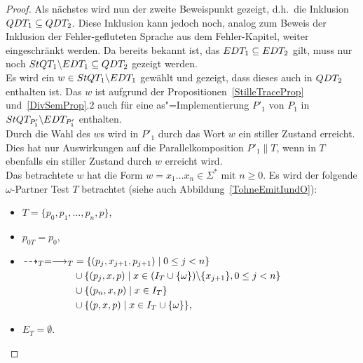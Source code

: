 \begin{proof}
  Als nächstes wird nun der zweite Beweispunkt gezeigt, d.h.\ die Inklusion
  $QDT _1\subseteq QDT _2$. Diese Inklusion kann jedoch noch, analog zum
  Beweis der Inklusion der Fehler-gefluteten Sprache aus dem Fehler-Kapitel,
  weiter eingeschränkt werden. Da bereits bekannt ist, das $EDT _1 \subseteq
  EDT _2$ gilt, muss nur noch $StQT _1\backslash EDT _1\subseteq QDT _2$
  gezeigt werden.\\
  Es wird ein $w\in StQT _1\backslash EDT _1$ gewählt und gezeigt, dass dieses
  auch in $QDT _2$ enthalten ist. Das $w$ ist aufgrund der
  Propositionen~\ref{StilleTraceProp} und~\ref{DivSemProp}.2 auch für eine
  as"=Implementierung $P'_1$ von $P_1$ in $StQT _{P'_1}\backslash EDT
  _{P'_1}$ enthalten.\\
  Durch die Wahl des $w$s wird in $P'_1$ durch das Wort $w$ ein stiller
  Zustand erreicht. Dies hat nur Auswirkungen auf die Parallelkomposition
  $P'_1\|T$, wenn in $T$ ebenfalls ein stiller Zustand durch $w$ erreicht
  wird.\\
  Das betrachtete $w$ hat die Form $w = x_1\dots x_n\in\Sigma ^*$ mit $n\geq
  0$. Es wird der folgende $\omega$-Partner Test $T$ betrachtet (siehe auch
  Abbildung~\ref{TohneEmitIundO}):
  \begin{itemize}
    \item $T=\{p_0,p_1,\dots ,p_n, p\}$,
    \item $p_{0T}=p_0$,
    \item $\begin{aligned}[t]
        \may _T = \must _T &= \{(p_j,x_{j+1},p_{j+1})\mid  0\leq j< n\}\\
        &\cup\{(p_j,x,p)\mid  x\in (I_T\cup \{\omega\})\backslash\{x_{j+1}\},
        0\leq j< n\}\\
        &\cup\{(p_n,x,p)\mid x\in I_T\}\\
        &\cup\{(p,x,p)\mid x\in I_T\cup\{\omega\}\},
    \end{aligned}$
    \item $E_T=\emptyset$.
  \end{itemize}
  \begin{figure} [h!tbp]
  \begin{center}
\end{center}
\end{figure}
\end{proof}
